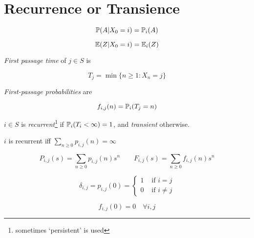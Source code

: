 \documentclass[a4paper]{article}
\begin{document}
\section{Recurrence or Transience}

\[ \P ( A | X_{0} = i) = \P_{i}(A) \]

\[ \E (Z | X_{0} = i) = \E_{i} (Z) \]
                           
\begin{defi}
	\emph{First passage time} of $ j \in S $ is 
	
	\[ T_{j} = \min \{ n\geq 1 : X_{n} = j \} \]
\end{defi}
                           
\begin{defi}               
	\emph{First-passage probabilities} are 
	                          
	\[ f_{i,j}(n) = \P_{i}(T_{j} = n) \]
\end{defi}

\begin{defi}
	$ i \in S $ is \emph{recurrent}\footnote{sometimes `persistent' is used} if $ \P_{i}(T_{i} < \infty) = 1 $, and \emph{transient} otherwise.
\end{defi}


\begin{thm} 
	$ i $ is recurrent iff $ \sum_{n \geq 0} p_{i,j}(n) = \infty$
	
	\[ P_{i,j}(s) = \sum_{n \geq 0} p_{i,j}(n)s^{n} \qquad  F_{i,j}(s) = \sum_{n \geq 0} f_{i,j}(n)s^{n} \]
	
	\[ \delta_{i,j} = p_{i,j}(0) = \begin{cases} 1  & \text{ if } i = j \\ 0 & \text{ if } i \neq j \end{cases} \]
	
	\[ f_{i,j}(0) = 0 \quad \forall i,j \]
\end{thm}



  
\end{document}

